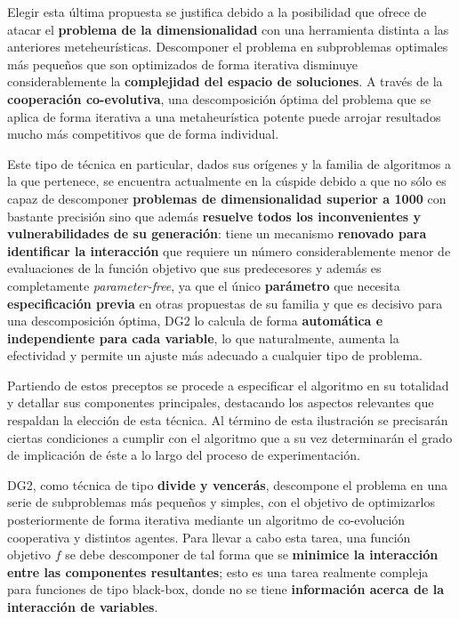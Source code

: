 Elegir esta última propuesta se justifica debido a la posibilidad que ofrece de atacar el \textbf{problema de la dimensionalidad} con una herramienta distinta a las anteriores meteheurísticas. Descomponer el problema en subproblemas optimales más pequeños que son optimizados de forma iterativa disminuye considerablemente la \textbf{complejidad del espacio de soluciones}. A través de la \textbf{cooperación co-evolutiva}, una descomposición óptima del problema que se aplica de forma iterativa a una metaheurística potente puede arrojar resultados mucho más competitivos que de forma individual.

Este tipo de técnica en particular, dados sus orígenes y la familia de algoritmos a la que pertenece, se encuentra actualmente en la cúspide debido a que no sólo es capaz de descomponer \textbf{problemas de dimensionalidad superior a 1000} con bastante precisión sino que además \textbf{resuelve todos los inconvenientes y vulnerabilidades de su generación}: tiene un mecanismo \textbf{renovado para identificar la interacción} que requiere un número considerablemente menor de evaluaciones de la función objetivo que sus predecesores y además es completamente \textit{parameter-free}, ya que el único \textbf{parámetro} que necesita \textbf{especificación previa} en otras propuestas de su familia y que es decisivo para una descomposición óptima, DG2 lo calcula de forma \textbf{automática e independiente para cada variable}, lo que naturalmente, aumenta la efectividad y permite un ajuste más adecuado a cualquier tipo de problema.

Partiendo de estos preceptos se procede a especificar el algoritmo en su totalidad y detallar sus componentes principales, destacando los aspectos relevantes que respaldan la elección de esta técnica. Al término de esta ilustración se precisarán ciertas condiciones a cumplir con el algoritmo que a su vez determinarán el grado de implicación de éste a lo largo del proceso de experimentación.

DG2, como técnica de tipo \textbf{divide y vencerás}, descompone el problema en una serie de subproblemas más pequeños y simples, con el objetivo de optimizarlos posteriormente de forma iterativa mediante un algoritmo de co-evolución cooperativa y distintos agentes. Para llevar a cabo esta tarea, una función objetivo $f$ se debe descomponer de tal forma que se \textbf{minimice la interacción entre las componentes resultantes}; esto es una tarea realmente compleja para funciones de tipo black-box, donde no se tiene \textbf{información acerca de la interacción de variables}.


